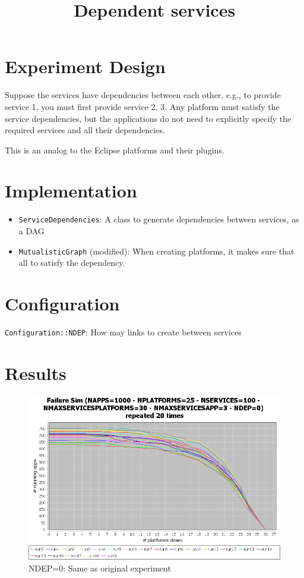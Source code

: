 \documentclass{article}
\begin{document}
\title{Dependent services}

\maketitle


\section{Experiment Design}

Suppose the services have dependencies between each other, e.g., to provide service 1, you must first provide service 2, 3. Any platform must satisfy the service dependencies, but the applications do not need to explicitly specify the required services and all their dependencies. 

This is an analog to the Eclipse platforms and their plugins.

\section{Implementation}

\begin{itemize}
\item
\texttt{ServiceDependencies}: A class to generate dependencies between services, as a DAG
\item
\texttt{MutualisticGraph} (modified): When creating platforms, it makes sure that all to satisfy the dependency.

\end{itemize}

\section{Configuration}
\texttt{Configuration::NDEP}: How may links to create between services


\section{Results}



\begin{figure}
\includegraphics[width=1.0\textwidth]{dep0}
\caption{NDEP=0: Same as original experiment}
\end{figure}
\end{document}
